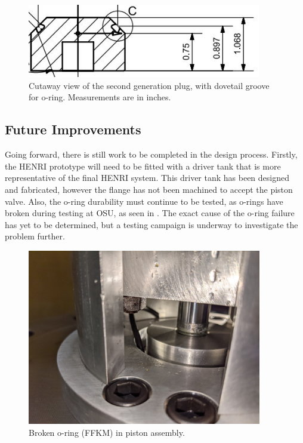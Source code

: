 
\begin{figure}[htbp]
    \vspace{16pt}
    \centering
    \includegraphics[width=4.032in]{design/photos/dovetail.JPG}
    \caption{Cutaway view of the second generation plug, with dovetail groove for o-ring. Measurements are in inches.}
    \label{fig:Dovetail Groove}
    \vspace{16pt}
\end{figure}




\subsection{Future Improvements} \label{s:improvements}
Going forward, there is still work to be completed in the design process. Firstly, the HENRI prototype will need to be fitted with a driver tank that is more representative of the final HENRI system. This driver tank has been designed and fabricated, however the flange has not been machined to accept the piston valve. Also, the o-ring durability must continue to be tested, as o-rings have broken during testing at OSU, as seen in . The exact cause of the o-ring failure has yet to be determined, but a testing campaign is underway to investigate the problem further.


\begin{figure}[htbp]
    \vspace{16pt}
    \centering
    \includegraphics[width=4.032in, height=3.024in]{design/photos/Piston_Broken_Oring.jpg}
    \caption{Broken o-ring (FFKM) in piston assembly.}
    \label{fig:broken oring piston}
    \vspace{16pt}
\end{figure}

